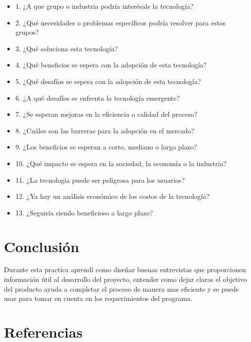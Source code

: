 \documentclass[11pt]{article}
\begin{document}
\begin{itemize}
\item 1. ¿A que grupo o industria podría interésale la tecnología?
\item 2. ¿Qué necesidades o problemas específicos podría resolver para estos
grupos?
\item 3. ¿Qué soluciona esta tecnología?
\item 4. ¿Qué beneficios se espera con la adopción de esta tecnología?
\item 5. ¿Qué desafíos se espera con la adopción de esta tecnología?
\item 6. ¿A qué desafíos se enfrenta la tecnología emergente?
\item 7. ¿Se esperan mejoras en la eficiencia o calidad del proceso?
\item 8. ¿Cuáles son las barreras para la adopción en el mercado?
\item 9. ¿Los beneficios se esperan a corto, mediano o largo plazo?
\item 10. ¿Qué impacto se espera en la sociedad, la economía o la industria?
\item 11. ¿La tecnología puede ser peligrosa para los usuarios?
\item 12. ¿Ya hay un análisis económico de los costos de la tecnología?
\item 13. ¿Seguiría siendo beneficioso a largo plazo?
\end{itemize}

\section{Conclusión}
\label{sec:org77bae4e}
Durante esta practica aprendí como diseñar buenas entrevistas que
proporcionen información útil al desarrollo del proyecto, entender como
dejar claras el objetivo del producto ayuda a completar el proceso de
manera mas eficiente y se puede usar para tomar en cuenta en los
requerimientos del programa. 

\section{Referencias}
\label{sec:orgee23087}
\printbibliography[heading=none]
\end{document}
